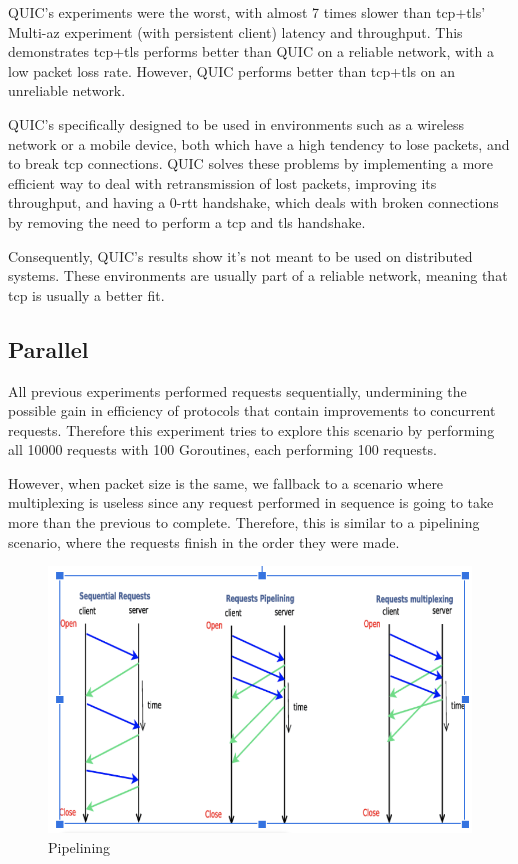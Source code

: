 QUIC’s experiments were the worst, with almost 7 times slower than \gls{tcp}+\gls{tls}’ Multi-\gls{az} experiment (with persistent client) latency and throughput. This demonstrates \gls{tcp}+\gls{tls} performs better than QUIC on a reliable network, with a low packet loss rate. However, QUIC performs better than \gls{tcp}+\gls{tls} on an unreliable network.

QUIC’s specifically designed to be used in environments such as a wireless network or a mobile device, both which have a high tendency to lose packets, and to break \gls{tcp} connections. QUIC solves these problems by implementing a more efficient way to deal with retransmission of lost packets, improving its throughput, and having a 0-\gls{rtt} handshake, which deals with broken connections by removing the need to perform a \gls{tcp} and \gls{tls} handshake.

Consequently, QUIC’s results show it's not meant to be used on distributed systems. These environments are usually part of a reliable network, meaning that \gls{tcp} is usually a better fit.

\subsection{Parallel}

All previous experiments performed requests sequentially, undermining the possible gain in efficiency of protocols that contain improvements to concurrent requests. Therefore this experiment tries to explore this scenario by performing all 10000 requests with 100 Goroutines, each performing 100 requests.

However, when packet size is the same, we fallback to a scenario where multiplexing is useless since any request performed in sequence is going to take more than the previous to complete. Therefore, this is similar to a pipelining scenario, where the requests finish in the order they were made.

\begin{figure}[h]
    \centering
    \includegraphics[width=\linewidth]{figures/pipelining.png}
    \caption{Pipelining}
    \label{fig:pipelining}
\end{figure}

